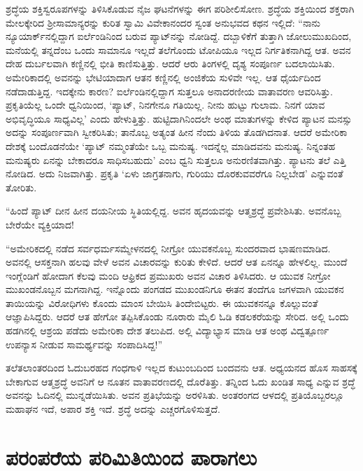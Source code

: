 ಶ್ರದ್ಧೆಯ ಶಕ್ತಿಸ್ವರೂಪಗಳನ್ನು ತಿಳಿಸಿಕೊಡುವ ನೈಜ ಘಟನೆಗಳನ್ನು ಈಗ ಪರಿಶೀಲಿಸೋಣ. ಶ್ರದ್ಧೆಯ ಶಕ್ತಿಯಿಂದ ಶಕ್ತರಾಗಿ ಮೇಲಕ್ಕೇರಿದ ಶ‍್ರೀಸಾಮಾನ್ಯರನ್ನು ಕುರಿತ ಸ್ವಾಮಿ ವಿವೇಕಾನಂದರ ಸ್ವಂತ ಅನುಭವದ ಕಥನ ಇಲ್ಲಿದೆ: “ನಾನು ನ್ಯೂಯಾರ್ಕ್​ನಲ್ಲಿದ್ದಾಗ ಐರ್ಲೆಂಡಿನಿಂದ ಬರುವ ಪ್ಯಾಟ್​ನನ್ನು ನೋಡಿದ್ದೆ. ದಬ್ಬಾಳಿಕೆಗೆ ತುತ್ತಾಗಿ ಜೋಲುಮುಖದಿಂದ, ಮನೆಯಲ್ಲಿ ತನ್ನದೆಂಬ ಒಂದು ಸಾಮಾನೂ ಇಲ್ಲದೆ ತಲೆಗೊಂದು ಟೋಪಿಯೂ ಇಲ್ಲದ ನಿರ್ಗತಿಕನಾಗಿದ್ದ ಆತ. ಅವನ ದೇಹ ದುರ್ಬಲವಾಗಿ ಕಣ್ಣಿನಲ್ಲಿ ಭೀತಿ ಕಾಣಿಸುತ್ತಿತ್ತು. ಆದರೆ ಆರು ತಿಂಗಳಲ್ಲಿ ದೃಶ್ಯ ಸಂಪೂರ್ಣ ಬದಲಾಯಿಸಿತು. ಅಮೇರಿಕಾದಲ್ಲಿ ಅವನನ್ನು ಭೇಟಿಯಾದಾಗ ಆತನ ಕಣ್ಣಿನಲ್ಲಿ ಅಂಜಿಕೆಯ ಸುಳಿವೇ ಇಲ್ಲ. ಆತ ಧೈರ್ಯದಿಂದ ನಡೆದಾಡುತ್ತಿದ್ದ. ಇದಕ್ಕೇನು ಕಾರಣ? ಐರ್ಲೆಂಡಿನಲ್ಲಿದ್ದಾಗ ಸುತ್ತಲೂ ಅನಾದರಣೀಯ ವಾತಾವರಣ ಆವರಿಸಿತ್ತು. ಪ್ರಕೃತಿಯೆಲ್ಲ ಒಂದೇ ಧ್ವನಿಯಿಂದ, ‘ಪ್ಯಾಟ್, ನಿನಗೇನೂ ಗತಿಯಿಲ್ಲ. ನೀನು ಹುಟ್ಟು ಗುಲಾಮ. ನಿನಗೆ ಯಾವ ಅಭಿವೃದ್ಧಿಯೂ ಸಾಧ್ಯವಿಲ್ಲ’ ಎಂದು ಹೇಳುತ್ತಿತ್ತು. ಹುಟ್ಟಿದಾಗಿನಿಂದಲೇ ಅಂಥ ಮಾತುಗಳನ್ನು ಕೇಳಿದ ಪ್ಯಾಟನ ಮನಸ್ಸು ಅದನ್ನು ಸಂಪೂರ್ಣವಾಗಿ ಸ್ವೀಕರಿಸಿತು; ತಾನೊಬ್ಬ ಅತ್ಯಂತ ಹೀನ ನೆಂದು ತಿಳಿಯ ತೊಡಗಿದ\-ನಾತ. ಆದರೆ ಅಮೇರಿಕಾ ದೇಶಕ್ಕೆ ಬಂದೊಡನೆಯೇ ‘ಪ್ಯಾಟ್ ನಮ್ಮಂತೆಯೇ ಒಬ್ಬ ಮನುಷ್ಯ. ಇದನ್ನೆಲ್ಲ ಮಾಡಿದವನು ಮನುಷ್ಯ. ನಿನ್ನಂತಹ ಮನುಷ್ಯರು ಏನನ್ನು ಬೇಕಾದರೂ ಸಾಧಿಸಬಹುದು’ ಎಂಬ ಧ್ವನಿ ಸುತ್ತಲೂ ಅನುರಣಿತವಾಗಿತ್ತು. ಪ್ಯಾಟನು ತಲೆ ಎತ್ತಿ ನೋಡಿದ. ಅದು ನಿಜವಾಗಿತ್ತು. ಪ್ರಕೃತಿ ‘ಏಳು ಜಾಗ್ರತನಾಗು, ಗುರಿಯು ದೊರಕುವವರೆಗೂ ನಿಲ್ಲಬೇಡ’ ಎನ್ನುವಂತೆ ತೋರಿತು.

“ಹಿಂದೆ ಪ್ಯಾಟ್ ದೀನ ಹೀನ ದಯನೀಯ ಸ್ಥಿತಿಯಲ್ಲಿದ್ದ. ಅವನ ಹೃದಯವನ್ನು ಆತ್ಮಶ್ರದ್ಧೆ ಪ್ರವೇಶಿಸಿತು. ಅವನೊಬ್ಬ ಬೇರೆಯೇ ವ್ಯಕ್ತಿಯಾದ!

“ಅಮೇರಿಕದಲ್ಲಿ ನಡೆದ ಸರ್ವಧರ್ಮಸಮ್ಮೇಳನದಲ್ಲಿ ನೀಗ್ರೋ ಯುವಕನೊಬ್ಬ ಸುಂದರವಾದ ಭಾಷಣಮಾಡಿದ. ಅವನಲ್ಲಿ ಆಸಕ್ತನಾಗಿ ಹಲವು ವೇಳೆ ಅವನ ವಿಚಾರವನ್ನು ಕುರಿತು ಕೇಳಿದೆ. ಆದರೆ ಆತ ಏನನ್ನೂ ಹೇಳಲಿಲ್ಲ. ಮುಂದೆ ಇಂಗ್ಲೆಂಡಿಗೆ ಹೋದಾಗ ಕೆಲವು ಮಂದಿ ಆಫ್ರಿಕದ ಪ್ರಮುಖರು ಅವನ ವಿಚಾರ ತಿಳಿಸಿದರು. ಆ ಯುವಕ ನೀಗ್ರೋ ಮುಖಂಡನೊಬ್ಬನ ಮಗನಾಗಿದ್ದ. ಇನ್ನೊಂದು ಪಂಗಡದ ಮುಖಂಡನಿಗೂ ಈತನ ತಂದೆಗೂ ಜಗಳವಾಗಿ ಯುವಕನ ತಾಯಿಯನ್ನು ವಿರೋಧಿಗಳು ಕೊಂದು ಮಾಂಸ ಬೇಯಿಸಿ ತಿಂದೇಬಿಟ್ಟರು. ಈ ಯುವಕನನ್ನೂ ಕೊಲ್ಲುವಂತೆ ಆಜ್ಞಾಪಿಸಿದ್ದರು. ಆದರೆ ಆತ ಹೇಗೋ ತಪ್ಪಿಸಿಕೊಂಡು ನೂರಾರು ಮೈಲಿ ಓಡಿ ಕಡಲಕರೆಯನ್ನು ಸೇರಿದ. ಅಲ್ಲಿ ಒಂದು ಹಡಗಿನಲ್ಲಿ ಆಶ್ರಯ ಪಡೆದು ಅಮೇರಿಕಾ ದೇಶ ತಲುಪಿದ. ಅಲ್ಲಿ ವಿದ್ಯಾಭ್ಯಾಸ ಮಾಡಿ ಆತ ಅಂಥ ವಿದ್ವತ್ಪೂರ್ಣ ಉಪನ್ಯಾಸ ನೀಡುವ ಸಾಮರ್ಥ್ಯವನ್ನು ಸಂಪಾದಿಸಿದ್ದ!”

ತಲೆತಲಾಂತರದಿಂದ ಓದುಬರಹದ ಗಂಧಗಾಳಿ ಇಲ್ಲದ ಕುಟುಂಬದಿಂದ ಬಂದವನು ಆತ. ಅಧ್ಯಯನದ ಹೊಸ ಸಾಹಸಕ್ಕೆ ಬೇಕಾಗುವ ಆತ್ಮಶ್ರದ್ಧೆ ಅವನಿಗೆ ಆ ನೂತನ ವಾತಾವರಣದಲ್ಲಿ ದೊರೆತಿತ್ತು. ತನ್ನಿಂದ ಓದು ಖಂಡಿತ ಸಾಧ್ಯ ಎನ್ನುವ ಶ್ರದ್ಧೆ ಅವನನ್ನು ಓದಿನಲ್ಲಿ ಮುನ್ನಡೆಯಿಸಿತು. ಅವನ ಪ್ರತಿಭೆಯನ್ನು ಅರಳಿಸಿತು. ಅಂತರಂಗದ ಆಳದಲ್ಲಿ ಪ್ರತಿಯೊಬ್ಬರಲ್ಲೂ ಮಹಾಘನ ಇದೆ, ಅಪಾರ ಶಕ್ತಿ ಇದೆ. ಶ್ರದ್ಧೆ ಅದನ್ನು ಎಚ್ಚರಗೊಳಿಸುತ್ತದೆ.


\section*{ಪರಂಪರೆಯ ಪರಿಮಿತಿಯಿಂದ ಪಾರಾಗಲು}

